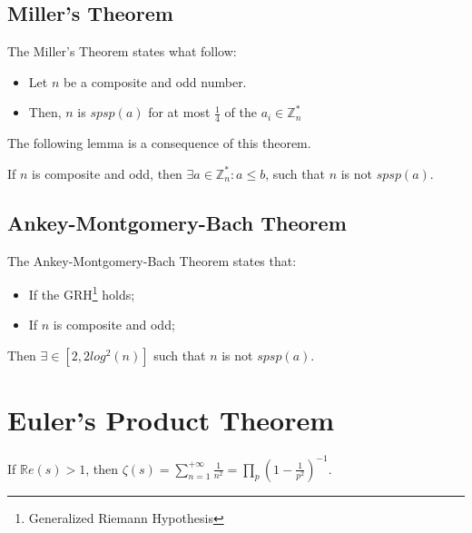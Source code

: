 \subsection{Miller's Theorem}
\begin{theorem}
    The Miller's Theorem states what follow:
    \begin{itemize}
        \item Let $n$ be a composite and odd number.
        \item Then, $n$ is $spsp(a)$ for at most $\frac{1}{4}$ of the $a_{i} \in \mathbb{Z}_{n}^{*}$
    \end{itemize}
\end{theorem}
The following lemma is a consequence of this theorem.
\begin{lemma}
    If $n$ is composite and odd, then $\exists a \in \mathbb{Z}_{n}^{*}: a \leq b$, such that $n$ is not $spsp(a)$.
\end{lemma}

\subsection{Ankey-Montgomery-Bach Theorem}
\begin{theorem}
    The Ankey-Montgomery-Bach Theorem states that:
    \begin{itemize}
        \item If the GRH\footnote{Generalized Riemann Hypothesis} holds;
        \item If $n$ is composite and odd;
    \end{itemize}
    Then $\exists \in [2, 2 log^{2}(n)]$ such that $n$ is not $spsp(a)$.
\end{theorem}

\section{Euler's Product Theorem}
\begin{theorem}
    If $\mathbb{R}e(s) > 1$, then $\zeta(s) = \sum_{n = 1}^{+ \infty} \frac{1}{n^{2}} = \prod\limits_{p}(1 - \frac{1}{p^{2}})^{-1}$.
\end{theorem}
